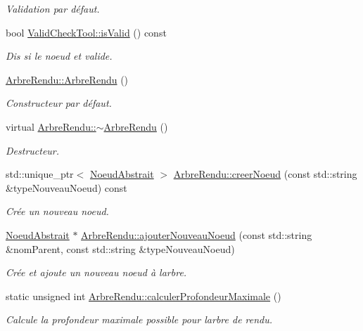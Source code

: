 \begin{DoxyCompactItemize}
\begin{DoxyCompactList}\small\item\em Validation par défaut. \end{DoxyCompactList}\item 
bool \hyperlink{group__inf2990_ga8917a37ee52e2661d510c79a43a4032d}{Valid\+Check\+Tool\+::is\+Valid} () const 
\begin{DoxyCompactList}\small\item\em Dis si le noeud et valide. \end{DoxyCompactList}\item 
\hyperlink{group__inf2990_gaef1e98a66c4f1d3b468c786edee45ae6}{Arbre\+Rendu\+::\+Arbre\+Rendu} ()
\begin{DoxyCompactList}\small\item\em Constructeur par défaut. \end{DoxyCompactList}\item 
virtual \hyperlink{group__inf2990_gadb462923759da0ff632dad097b7bfdab}{Arbre\+Rendu\+::$\sim$\+Arbre\+Rendu} ()
\begin{DoxyCompactList}\small\item\em Destructeur. \end{DoxyCompactList}\item 
std\+::unique\+\_\+ptr$<$ \hyperlink{class_noeud_abstrait}{Noeud\+Abstrait} $>$ \hyperlink{group__inf2990_gaead1f3ae9de5de53e31ad9e886ba259c}{Arbre\+Rendu\+::creer\+Noeud} (const std\+::string \&type\+Nouveau\+Noeud) const 
\begin{DoxyCompactList}\small\item\em Crée un nouveau noeud. \end{DoxyCompactList}\item 
\hyperlink{class_noeud_abstrait}{Noeud\+Abstrait} $\ast$ \hyperlink{group__inf2990_gac10e5f0623af502d67f72aef764206a3}{Arbre\+Rendu\+::ajouter\+Nouveau\+Noeud} (const std\+::string \&nom\+Parent, const std\+::string \&type\+Nouveau\+Noeud)
\begin{DoxyCompactList}\small\item\em Crée et ajoute un nouveau noeud à l\textquotesingle{}arbre. \end{DoxyCompactList}\item 
static unsigned int \hyperlink{group__inf2990_gacf0e53d52040b07cd6550fda79867bd5}{Arbre\+Rendu\+::calculer\+Profondeur\+Maximale} ()
\begin{DoxyCompactList}\small\item\em Calcule la profondeur maximale possible pour l\textquotesingle{}arbre de rendu. \end{DoxyCompactList}\item 

\end{DoxyCompactItemize}
